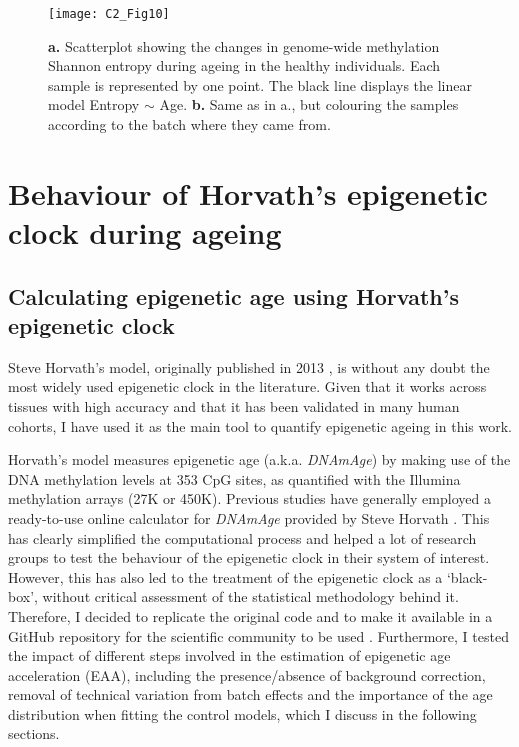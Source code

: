 \begin{figure}[htbp!] 
	\centering
	\vspace*{2mm}    
	\texttt{[image: C2\_Fig10]}
	\caption[Genome-wide methylation Shannon entropy during physiological ageing]{\textbf{a.} Scatterplot showing the changes in genome-wide methylation Shannon entropy during ageing in the healthy individuals. Each sample is represented by one point. The black line displays the linear model Entropy $\sim$ Age. \textbf{b.} Same as in a., but colouring the samples according to the batch where they came from.}
	\label{fig:c2_fig10}
\end{figure}


\smallskip

\section{Behaviour of Horvath's epigenetic clock during ageing}

\smallskip

\subsection{Calculating epigenetic age using Horvath's epigenetic clock} \label{s:2.2.1}

\smallskip

Steve Horvath's model, originally published in 2013 \cite{Horvath2013}, is without any doubt the most widely used epigenetic clock in the literature. Given that it works across tissues with high accuracy and that it has been validated in many human cohorts, I have used it as the main tool to quantify epigenetic ageing in this work. 

\bigskip

Horvath's model measures epigenetic age (a.k.a. \textit{DNAmAge}) by making use of the DNA methylation levels at 353 CpG sites, as quantified with the Illumina methylation arrays (27K or 450K). Previous studies have generally employed a ready-to-use online calculator for \textit{DNAmAge} provided by Steve Horvath \cite{Horvath2013b}. This has clearly simplified the computational process and helped a lot of research groups to test the behaviour of the epigenetic clock in their system of interest. However, this has also led to the treatment of the epigenetic clock as a `black-box’, without critical assessment of the statistical methodology behind it. Therefore, I decided to replicate the original code and to make it available in a GitHub repository for the scientific community to be used \cite{Martin-Herranz2019}. Furthermore, I tested the impact of different steps involved in the estimation of epigenetic age acceleration (EAA), including the presence/absence of background correction, removal of technical variation from batch effects and the importance of the age distribution when fitting the control models, which I discuss in the following sections. 

